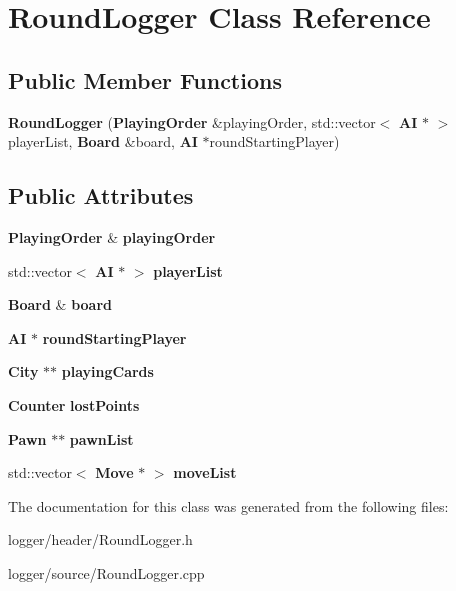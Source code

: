 \section{Round\-Logger Class Reference}
\label{class_round_logger}
\subsection*{Public Member Functions}
\begin{DoxyCompactItemize}
\item 
{\bfseries Round\-Logger} ({\bf Playing\-Order} \&playing\-Order, std\-::vector$<$ {\bf A\-I} $\ast$ $>$ player\-List, {\bf Board} \&board, {\bf A\-I} $\ast$round\-Starting\-Player)\label{class_round_logger_a319ff2d7dee4b15c102138bda1b027fc}

\end{DoxyCompactItemize}
\subsection*{Public Attributes}
\begin{DoxyCompactItemize}
\item 
{\bf Playing\-Order} \& {\bfseries playing\-Order}\label{class_round_logger_a7fd0f9fd826753aa3715ba85e863ab3f}

\item 
std\-::vector$<$ {\bf A\-I} $\ast$ $>$ {\bfseries player\-List}\label{class_round_logger_aebd799e774b85f36a77e1fa4cfe5687b}

\item 
{\bf Board} \& {\bfseries board}\label{class_round_logger_a256a2d63cc85c71f8a57268b1829e6df}

\item 
{\bf A\-I} $\ast$ {\bfseries round\-Starting\-Player}\label{class_round_logger_adfb669d859b3e9e1bd18a8ae1a31cf6b}

\item 
{\bf City} $\ast$$\ast$ {\bfseries playing\-Cards}\label{class_round_logger_a4e30b0c6cf75d64dd8c3af86e240e188}

\item 
{\bf Counter} {\bfseries lost\-Points}\label{class_round_logger_a48257ec06504aa78fc89fe943d06aca8}

\item 
{\bf Pawn} $\ast$$\ast$ {\bfseries pawn\-List}\label{class_round_logger_a3ba92d778f19c90572cfa6d7df0dcd5f}

\item 
std\-::vector$<$ {\bf Move} $\ast$ $>$ {\bfseries move\-List}\label{class_round_logger_a0c998b04cc3185ea20d2a7444cda1323}

\end{DoxyCompactItemize}


The documentation for this class was generated from the following files\-:\begin{DoxyCompactItemize}
\item 
logger/header/Round\-Logger.\-h\item 
logger/source/Round\-Logger.\-cpp\end{DoxyCompactItemize}
